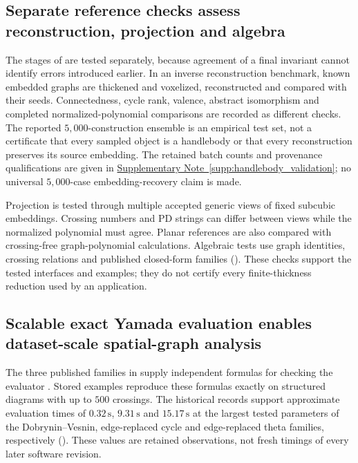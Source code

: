 \documentclass[10pt,twocolumn]{article}
\providecommand{\SuppSubsecref}[1]{\hyperref[#1]{Supplementary Note~\ref*{#1}}}
\begin{document}
\subsection{Separate reference checks assess reconstruction, projection and algebra}
\label{sec:validation_main}
The stages of  are tested separately, because agreement of a final invariant cannot identify errors introduced earlier. In an inverse reconstruction benchmark, known embedded graphs are thickened and voxelized, reconstructed and compared with their seeds. Connectedness, cycle rank, valence, abstract isomorphism and completed normalized-polynomial comparisons are recorded as different checks. The reported $5{,}000$-construction ensemble is an empirical test set, not a certificate that every sampled object is a handlebody or that every reconstruction preserves its source embedding. The retained batch counts and provenance qualifications are given in \SuppSubsecref{supp:handlebody_validation}; no universal $5{,}000$-case embedding-recovery claim is made.

Projection is tested through multiple accepted generic views of fixed subcubic embeddings. Crossing numbers and PD strings can differ between views while the normalized polynomial must agree. Planar references are also compared with crossing-free graph-polynomial calculations. Algebraic tests use graph identities, crossing relations and published closed-form families (). These checks support the tested interfaces and examples; they do not certify every finite-thickness reduction used by an application.

\subsection{Scalable exact Yamada evaluation enables dataset-scale spatial-graph analysis}
\label{sec:performance}
The three published families in  supply independent formulas for checking the evaluator \cite{kg_dobrynin1996yamada,kg_li2018yamada}. Stored examples reproduce these formulas exactly on structured diagrams with up to $500$ crossings. The historical records support approximate evaluation times of $0.32\,\mathrm{s}$, $9.31\,\mathrm{s}$ and $15.17\,\mathrm{s}$ at the largest tested parameters of the Dobrynin--Vesnin, edge-replaced cycle and edge-replaced theta families, respectively (). These values are retained observations, not fresh timings of every later software revision.
\end{document}
